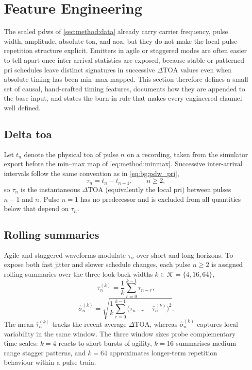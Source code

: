 \section{Feature Engineering}\label{sec:method:features}

The scaled \glspl{pdw} of \cref{sec:method:data} already carry carrier frequency, pulse width, amplitude, absolute \gls{toa}, and \gls{aoa}, but they do not make the local pulse-repetition structure explicit.
Emitters in agile or staggered modes are often easier to tell apart once inter-arrival statistics are exposed, because stable or patterned \gls{pri} schedules leave distinct signatures in successive $\Delta\mathrm{TOA}$ values even when absolute timing has been min--max mapped.
This section therefore defines a small set of causal, hand-crafted timing features, documents how they are appended to the base input, and states the burn-in rule that makes every engineered channel well defined.

\subsection{Delta \gls{toa}}\label{sec:method:features:delta}

Let $t_n$ denote the physical \gls{toa} of pulse $n$ on a recording, taken from the simulator export before the min--max map of \cref{eq:method:minmax}.
Successive inter-arrival intervals follow the same convention as in \cref{eq:bg:pdw_pri},
\begin{equation}\label{eq:method:delta_toa}
  \tau_n = t_n - t_{n-1},
  \qquad n \ge 2,
\end{equation}
so $\tau_n$ is the instantaneous $\Delta\mathrm{TOA}$ (equivalently the local \gls{pri}) between pulses $n-1$ and $n$.
Pulse $n=1$ has no predecessor and is excluded from all quantities below that depend on $\tau_n$.

\subsection{Rolling summaries}\label{sec:method:features:rolling}

Agile and staggered waveforms modulate $\tau_n$ over short and long horizons.
To expose both fast jitter and slower schedule changes, each pulse $n \ge 2$ is assigned rolling summaries over the three look-back widths $k \in \mathcal{K} = \{4,16,64\}$,
\begin{equation}\label{eq:method:rolling_mean}
  \bar{\tau}^{(k)}_n
  =
  \frac{1}{k}\sum_{r=0}^{k-1} \tau_{n-r},
\end{equation}
\begin{equation}\label{eq:method:rolling_std}
  \hat{\sigma}^{(k)}_n
  =
  \sqrt{\frac{1}{k}\sum_{r=0}^{k-1}\bigl(\tau_{n-r} - \bar{\tau}^{(k)}_n\bigr)^2}.
\end{equation}
The mean $\bar{\tau}^{(k)}_n$ tracks the recent average $\Delta\mathrm{TOA}$, whereas $\hat{\sigma}^{(k)}_n$ captures local variability in the same window.
The three window sizes probe complementary time scales: $k=4$ reacts to short bursts of agility, $k=16$ summarises medium-range stagger patterns, and $k=64$ approximates longer-term repetition behaviour within a pulse train.


